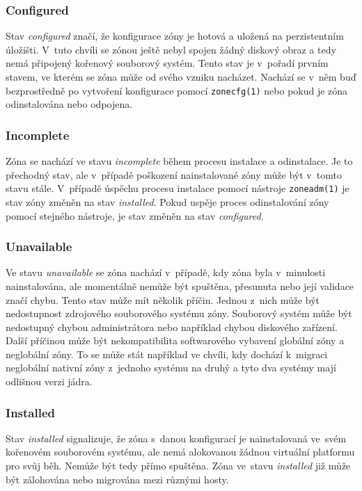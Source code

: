 \subsubsection{Configured}
\label{chapter:zones:administration:states:configured}
Stav \textit{configured} značí, že konfigurace zóny je hotová a uložená na perzistentním úložišti. V~tuto chvíli se zónou
ještě nebyl spojen žádný diskový obraz a tedy nemá připojený kořenový souborový systém. Tento stav je v~pořadí prvním stavem,
ve kterém se zóna může od svého vzniku nacházet. Nachází se v~něm buď bezprostředně po vytvoření konfigurace pomocí \verb|zonecfg(1)|
nebo pokud je zóna odinstalována nebo odpojena.
\subsubsection{Incomplete}
\label{chapter:zones:administration:states:incomplete}
Zóna se nachází ve stavu \textit{incomplete} během procesu instalace a odinstalace. Je to přechodný stav, ale v~případě poškození
nainstalované zóny může být v~tomto stavu stále. V~případě úspěchu procesu instalace pomocí nástroje \verb|zoneadm(1)| je 
stav zóny změněn na stav \textit{installed}. Pokud uspěje proces odinstalování zóny pomocí stejného nástroje, je stav
změněn na stav \textit{configured}.
\subsubsection{Unavailable}
\label{chapter:zones:administration:states:unavailable}
Ve stavu \textit{unavailable} se zóna nachází v~případě, kdy zóna byla v~minulosti nainstalována, ale momentálně nemůže být
spuštěna, přesunuta nebo její validace značí chybu. Tento stav může mít několik příčin. Jednou z~nich může být nedostupnost
zdrojového souborového systému zóny. Souborový systém může být nedostupný chybou administrátora nebo například chybou diskového
zařízení. Další příčinou může být nekompatibilita softwarového vybavení globální zóny a neglobální zóny. To se může stát například
ve chvíli, kdy dochází k~migraci neglobální nativní zóny z~jednoho systému na druhý a tyto dva systémy mají odlišnou verzi jádra.
\subsubsection{Installed}
\label{chapter:zones:administration:states:installed}
Stav \textit{installed} signalizuje, že zóna s~danou konfigurací je nainstalovaná ve~svém kořenovém souborovém systému,
ale nemá alokovanou žádnou virtuální platformu pro svůj běh. Nemůže být tedy přímo spuštěna. Zóna ve~stavu
\textit{installed} již může být zálohována nebo migrována mezi různými hosty. 
